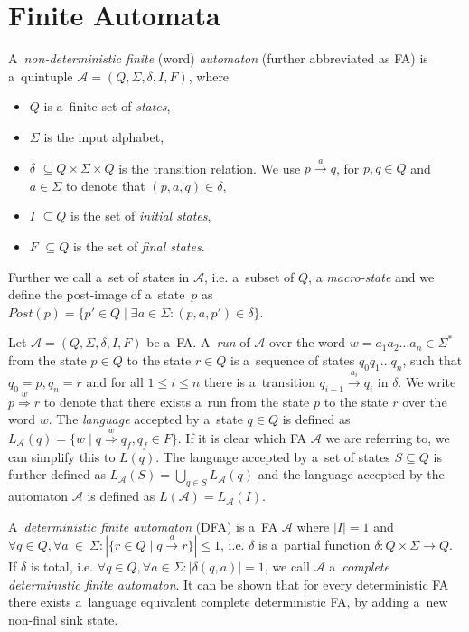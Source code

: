  \section{Finite Automata}

 A~\emph{non-deterministic finite} (word) \emph{automaton} (further abbreviated
 as FA) is a~quintuple $\mathcal{A} = (Q, \Sigma, \delta, I, F)$, where
  \begin{itemize}
\item $Q$ is a~finite set of \emph{states},  
\item $\Sigma$ is the input alphabet, \item $\delta$ $ \subseteq Q
\times\Sigma\times Q$ is the transition relation. We use $p
\overset{a}{\longrightarrow} q$, for $p, q \in Q$ and $a \in \Sigma$ to denote
that $(p, a, q) \in \delta$,
\item $I$ $ \subseteq Q$ is the set of \emph{initial states}, 
\item $F$ $ \subseteq Q$ is the set of \emph{final states}.
	\end{itemize}
	
	Further we call a~set of states in $\mathcal{A}$, i.e. a~subset of $Q$, a
\emph{macro-state} and we define the post-image of a~state~$p$ as
$Post(p) = \{p'\in Q \mid \exists a \in \Sigma: (p, a, p') \in \delta\}$.
	
Let $\mathcal{A} = (Q, \Sigma, \delta, I, F)$ be a~FA. A~\emph{run} of
$\mathcal{A}$ over the word $w = a_1a_2\ldots a_n \in \Sigma^*$ from the state
$p \in Q$ to the state $r \in Q$ is a~sequence of states $q_0q_1\ldots q_n$,
such that $q_0 = p, q_n = r$ and for all $1 \leq i \leq n$ there is a~transition
$q_{i-1} \overset{a_i}{\longrightarrow} q_i$ in $\delta$. We write $p
\overset{w}{\Longrightarrow} r$ to denote that there exists a~run from the state
$p$ to the state $r$ over the word $w$.
\newpage
The \emph{language} accepted by a~state $q \in Q$ is defined as
$L_{\mathcal{A}}(q) = \{w \mid q \overset{w}{\Longrightarrow} q_f, q_f \in F\}$.
If it is clear which FA $\mathcal{A}$ we are referring to, we can simplify
this to $L(q)$. The language accepted by a~set of states $S \subseteq
Q$ is further defined as $L_{\mathcal{A}}(S) = \bigcup_{q \in S}
L_{\mathcal{A}}(q)$ and the language accepted by the automaton $\mathcal{A}$ is
defined as $L(\mathcal{A}) = L_{\mathcal{A}}(I)$.
	
A~\emph{deterministic finite automaton} (DFA) is a~FA $\mathcal{A}$ where $|I| =
1$ and $\forall q \in Q, \forall a~\in~\Sigma: |\{ r \in Q \mid q
\overset{a}{\longrightarrow} r\}| \leq 1$, i.e. $\delta$ is a~partial function
$\delta : Q \times \Sigma \longrightarrow Q$. If $\delta$ is total, i.e.
$\forall q \in Q, \forall a \in \Sigma : |\delta(q, a)| = 1$, we call
$\mathcal{A}$ a~\emph{complete deterministic finite automaton}. It can be shown
that for every deterministic FA there exists a~language equivalent complete
deterministic FA, by adding a~new non-final sink state.
	
